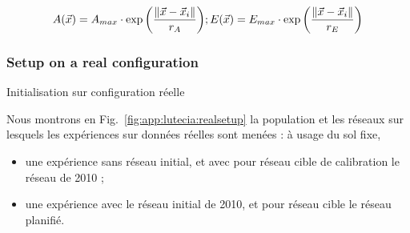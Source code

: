 


\[
A(\vec{x}) = A_{max} \cdot \exp{\left(\frac{\| \vec{x}-\vec{x}_i \|}{r_A}\right)} ; 
E(\vec{x}) = E_{max} \cdot \exp{\left(\frac{\| \vec{x}-\vec{x}_i \|}{r_E}\right)}
\]



\subsubsection{Setup on a real configuration}{Initialisation sur configuration réelle}

Nous montrons en Fig.~\ref{fig:app:lutecia:realsetup} la population et les réseaux sur lesquels les expériences sur données réelles sont menées : à usage du sol fixe,
\begin{itemize}
	\item une expérience sans réseau initial, et avec pour réseau cible de calibration le réseau de 2010 ;
	\item une expérience avec le réseau initial de 2010, et pour réseau cible le réseau planifié.
\end{itemize} 


